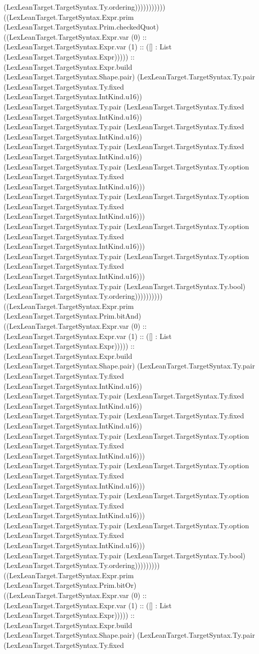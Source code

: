 \documentclass[11pt]{article}
\begin{document}
(LexLeanTarget.TargetSyntax.Ty.ordering))))))))))) ((LexLeanTarget.TargetSyntax.Expr.prim (LexLeanTarget.TargetSyntax.Prim.checkedQuot) ((LexLeanTarget.TargetSyntax.Expr.var (0) :: (LexLeanTarget.TargetSyntax.Expr.var (1) :: ([] : List (LexLeanTarget.TargetSyntax.Expr))))) :: (LexLeanTarget.TargetSyntax.Expr.build (LexLeanTarget.TargetSyntax.Shape.pair) (LexLeanTarget.TargetSyntax.Ty.pair (LexLeanTarget.TargetSyntax.Ty.fixed (LexLeanTarget.TargetSyntax.IntKind.u16)) (LexLeanTarget.TargetSyntax.Ty.pair (LexLeanTarget.TargetSyntax.Ty.fixed (LexLeanTarget.TargetSyntax.IntKind.u16)) (LexLeanTarget.TargetSyntax.Ty.pair (LexLeanTarget.TargetSyntax.Ty.fixed (LexLeanTarget.TargetSyntax.IntKind.u16)) (LexLeanTarget.TargetSyntax.Ty.pair (LexLeanTarget.TargetSyntax.Ty.fixed (LexLeanTarget.TargetSyntax.IntKind.u16)) (LexLeanTarget.TargetSyntax.Ty.pair (LexLeanTarget.TargetSyntax.Ty.option (LexLeanTarget.TargetSyntax.Ty.fixed (LexLeanTarget.TargetSyntax.IntKind.u16))) (LexLeanTarget.TargetSyntax.Ty.pair (LexLeanTarget.TargetSyntax.Ty.option (LexLeanTarget.TargetSyntax.Ty.fixed (LexLeanTarget.TargetSyntax.IntKind.u16))) (LexLeanTarget.TargetSyntax.Ty.pair (LexLeanTarget.TargetSyntax.Ty.option (LexLeanTarget.TargetSyntax.Ty.fixed (LexLeanTarget.TargetSyntax.IntKind.u16))) (LexLeanTarget.TargetSyntax.Ty.pair (LexLeanTarget.TargetSyntax.Ty.option (LexLeanTarget.TargetSyntax.Ty.fixed (LexLeanTarget.TargetSyntax.IntKind.u16))) (LexLeanTarget.TargetSyntax.Ty.pair (LexLeanTarget.TargetSyntax.Ty.bool) (LexLeanTarget.TargetSyntax.Ty.ordering)))))))))) ((LexLeanTarget.TargetSyntax.Expr.prim (LexLeanTarget.TargetSyntax.Prim.bitAnd) ((LexLeanTarget.TargetSyntax.Expr.var (0) :: (LexLeanTarget.TargetSyntax.Expr.var (1) :: ([] : List (LexLeanTarget.TargetSyntax.Expr))))) :: (LexLeanTarget.TargetSyntax.Expr.build (LexLeanTarget.TargetSyntax.Shape.pair) (LexLeanTarget.TargetSyntax.Ty.pair (LexLeanTarget.TargetSyntax.Ty.fixed (LexLeanTarget.TargetSyntax.IntKind.u16)) (LexLeanTarget.TargetSyntax.Ty.pair (LexLeanTarget.TargetSyntax.Ty.fixed (LexLeanTarget.TargetSyntax.IntKind.u16)) (LexLeanTarget.TargetSyntax.Ty.pair (LexLeanTarget.TargetSyntax.Ty.fixed (LexLeanTarget.TargetSyntax.IntKind.u16)) (LexLeanTarget.TargetSyntax.Ty.pair (LexLeanTarget.TargetSyntax.Ty.option (LexLeanTarget.TargetSyntax.Ty.fixed (LexLeanTarget.TargetSyntax.IntKind.u16))) (LexLeanTarget.TargetSyntax.Ty.pair (LexLeanTarget.TargetSyntax.Ty.option (LexLeanTarget.TargetSyntax.Ty.fixed (LexLeanTarget.TargetSyntax.IntKind.u16))) (LexLeanTarget.TargetSyntax.Ty.pair (LexLeanTarget.TargetSyntax.Ty.option (LexLeanTarget.TargetSyntax.Ty.fixed (LexLeanTarget.TargetSyntax.IntKind.u16))) (LexLeanTarget.TargetSyntax.Ty.pair (LexLeanTarget.TargetSyntax.Ty.option (LexLeanTarget.TargetSyntax.Ty.fixed (LexLeanTarget.TargetSyntax.IntKind.u16))) (LexLeanTarget.TargetSyntax.Ty.pair (LexLeanTarget.TargetSyntax.Ty.bool) (LexLeanTarget.TargetSyntax.Ty.ordering))))))))) ((LexLeanTarget.TargetSyntax.Expr.prim (LexLeanTarget.TargetSyntax.Prim.bitOr) ((LexLeanTarget.TargetSyntax.Expr.var (0) :: (LexLeanTarget.TargetSyntax.Expr.var (1) :: ([] : List (LexLeanTarget.TargetSyntax.Expr))))) :: (LexLeanTarget.TargetSyntax.Expr.build (LexLeanTarget.TargetSyntax.Shape.pair) (LexLeanTarget.TargetSyntax.Ty.pair (LexLeanTarget.TargetSyntax.Ty.fixed 
\end{document}
